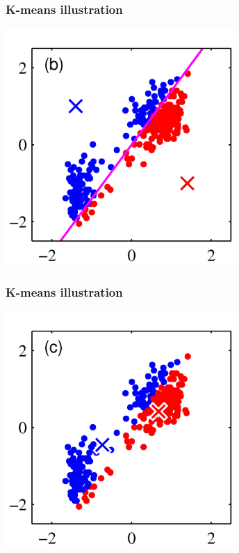 \documentclass[12pt,notes,mathserif]{beamer}
\begin{document}
\begin{frame}[c]
	\frametitle{K-means illustration}
	\begin{center}
		\includegraphics[width=0.65\textwidth]{fig/lec719.jpg}
	\end{center}
\end{frame}
\begin{frame}[c]
	\frametitle{K-means illustration}
	\begin{center}
		\includegraphics[width=0.65\textwidth]{fig/lec720.jpg}
	\end{center}
\end{frame}
\end{document}
